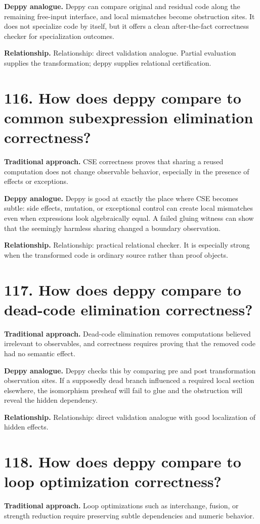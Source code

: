\documentclass[11pt,openany]{book}
\begin{document}
\textbf{Deppy analogue.} Deppy can compare original and residual code along the remaining free-input interface, and local mismatches become obstruction sites. It does not specialize code by itself, but it offers a clean after-the-fact correctness checker for specialization outcomes.

\textbf{Relationship.} Relationship: direct validation analogue. Partial evaluation supplies the transformation; deppy supplies relational certification.

\section*{116. How does deppy compare to common subexpression elimination correctness?}
\textbf{Traditional approach.} CSE correctness proves that sharing a reused computation does not change observable behavior, especially in the presence of effects or exceptions.

\textbf{Deppy analogue.} Deppy is good at exactly the place where CSE becomes subtle: side effects, mutation, or exceptional control can create local mismatches even when expressions look algebraically equal. A failed gluing witness can show that the seemingly harmless sharing changed a boundary observation.

\textbf{Relationship.} Relationship: practical relational checker. It is especially strong when the transformed code is ordinary source rather than proof objects.

\section*{117. How does deppy compare to dead-code elimination correctness?}
\textbf{Traditional approach.} Dead-code elimination removes computations believed irrelevant to observables, and correctness requires proving that the removed code had no semantic effect.

\textbf{Deppy analogue.} Deppy checks this by comparing pre and post transformation observation sites. If a supposedly dead branch influenced a required local section elsewhere, the isomorphism presheaf will fail to glue and the obstruction will reveal the hidden dependency.

\textbf{Relationship.} Relationship: direct validation analogue with good localization of hidden effects.

\section*{118. How does deppy compare to loop optimization correctness?}
\textbf{Traditional approach.} Loop optimizations such as interchange, fusion, or strength reduction require preserving subtle dependencies and numeric behavior.
\end{document}
